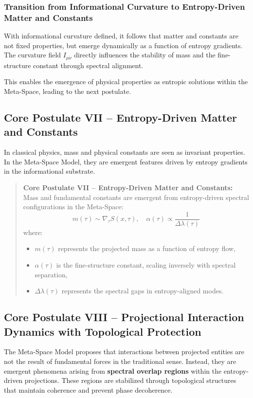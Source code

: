 \documentclass[10.5pt,a4paper]{article}
\begin{document}
\subsubsection*{Transition from Informational Curvature to Entropy-Driven Matter and Constants}

With informational curvature defined, it follows that matter and constants are not fixed properties, but emerge dynamically as a function of entropy gradients. The curvature field \(I_{\mu\nu}\) directly influences the stability of mass and the fine-structure constant through spectral alignment.

This enables the emergence of physical properties as entropic solutions within the Meta-Space, leading to the next postulate.

\subsection{Core Postulate VII – Entropy-Driven Matter and Constants}

In classical physics, mass and physical constants are seen as invariant properties. In the Meta-Space Model, they are emergent features driven by entropy gradients in the informational substrate.

\begin{quote}
\textbf{Core Postulate VII – Entropy-Driven Matter and Constants:}  
Mass and fundamental constants are emergent from entropy-driven spectral configurations in the Meta-Space:
\[
m(\tau) \sim \nabla_\tau S(x, \tau), \quad \alpha(\tau) \propto \frac{1}{\Delta \lambda(\tau)}
\]
where:
\begin{itemize}
    \item \(m(\tau)\) represents the projected mass as a function of entropy flow,
    \item \(\alpha(\tau)\) is the fine-structure constant, scaling inversely with spectral separation,
    \item \(\Delta \lambda(\tau)\) represents the spectral gaps in entropy-aligned modes.
\end{itemize}
\end{quote}

\subsection{Core Postulate VIII – Projectional Interaction Dynamics with Topological Protection}

The Meta-Space Model proposes that interactions between projected entities are not the result of fundamental forces in the traditional sense. Instead, they are emergent phenomena arising from \textbf{spectral overlap regions} within the entropy-driven projections. These regions are stabilized through topological structures that maintain coherence and prevent phase decoherence.
\end{document}
